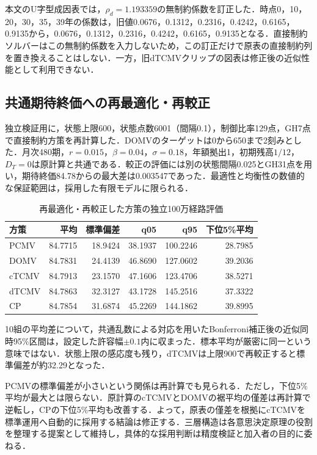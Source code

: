 \documentclass[10pt,a4paper]{article}
\theoremstyle{plain}
\theoremstyle{definition}
\begin{document}
本文のU字型成因表では，$\rho_d=1.193359$の無制約係数を訂正した．時点0，10，20，30，35，39年の係数は，旧値0.0676，0.1312，0.2316，0.4242，0.6165，0.9135から，0.0676，0.1312，0.2316，0.4242，0.6165，0.9135となる．直接制約ソルバーはこの無制約係数を入力しないため，この訂正だけで原表の直接制約列を置き換えることはしない．一方，旧dTCMVクリップの図表は修正後の近似性能として利用できない．

\subsection{共通期待終価への再最適化・再較正}
独立検証用に，状態上限600，状態点数6001（間隔0.1），制御比率129点，GH7点で直接制約方策を再計算した．DOMVのターゲットは0から650まで2刻みとした．月次480期，$r=0.015$，$\beta=0.04$，$\sigma=0.18$，年額拠出1，初期残高$1/12$，$D_T=0$は原計算と共通である．較正の評価には別の状態間隔0.025とGH31点を用い，期待終価84.78からの最大差は0.003547であった．最適性と均衡性の数値的な保証範囲は，採用した有限モデルに限られる．

\begin{table}[htbp]\centering\small
\caption{再最適化・再較正した方策の独立100万経路評価}\label{tab:corrected-v8}
\begin{tabular}{lrrrrr}\toprule
方策 & 平均 & 標準偏差 & q05 & q95 & 下位5\%平均\\\midrule
PCMV &84.7715&18.9424&38.1937&100.2246&28.7985\\
DOMV &84.7831&24.4139&46.8690&127.0602&39.2036\\
cTCMV&84.7913&23.1570&47.1606&123.4706&38.5271\\
dTCMV&84.7863&32.3127&43.1728&145.2516&37.3322\\
CP&84.7854&31.6874&45.2269&144.1862&39.8995\\\bottomrule
\end{tabular}\end{table}
10組の平均差について，共通乱数による対応を用いたBonferroni補正後の近似同時95\%区間は，設定した許容幅$\pm0.1$内に収まった．標本平均が厳密に同一という意味ではない．状態上限の感応度も残り，dTCMVは上限900で再較正すると標準偏差が約32.29となった．

PCMVの標準偏差が小さいという関係は再計算でも見られる．ただし，下位5\%平均が最大とは限らない．原計算のcTCMVとDOMVの裾平均の僅差は再計算で逆転し，CPの下位5\%平均も改善する．よって，原表の僅差を根拠にcTCMVを標準運用へ自動的に採用する結論は修正する．三層構造は各意思決定原理の役割を整理する提案として維持し，具体的な採用判断は精度検証と加入者の目的に委ねる．
\end{document}

